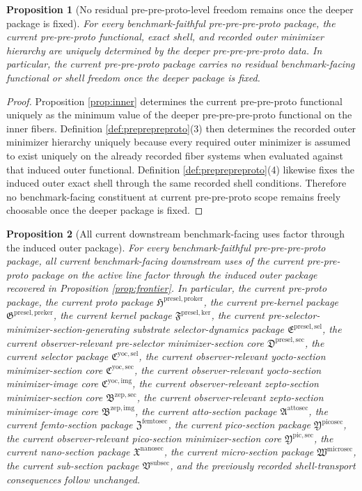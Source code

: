 \documentclass[11pt]{article}
\newcommand{\ProtoKernelPackage}{\mathfrak H^{\mathrm{presel,proker}}}
\newcommand{\PreKernelPackage}{\mathfrak G^{\mathrm{presel,preker}}}
\newcommand{\KernelPackage}{\mathfrak F^{\mathrm{presel,ker}}}
\newcommand{\PreSectionSelectorPackage}{\mathfrak E^{\mathrm{presel,sel}}}
\newcommand{\PreSelectorMinSectionCore}{\mathfrak D^{\mathrm{presel,sec}}}
\newcommand{\YoctoSelectorPackage}{\mathfrak C^{\mathrm{yoc,sel}}}
\newcommand{\YoctoImageCore}{\mathfrak C^{\mathrm{yoc,img}}}
\newcommand{\YoctoMinSectionCore}{\mathfrak C^{\mathrm{yoc,sec}}}
\newcommand{\ZeptoImageCore}{\mathfrak B^{\mathrm{zep,img}}}
\newcommand{\ZeptoMinSectionCore}{\mathfrak B^{\mathrm{zep,sec}}}
\newcommand{\AttoSectionPackage}{\mathfrak A^{\mathrm{attosec}}}
\newcommand{\FemtoSectionPackage}{\mathfrak Z^{\mathrm{femtosec}}}
\newcommand{\PicoSectionPackage}{\mathfrak Y^{\mathrm{picosec}}}
\newcommand{\PicoMinSectionCore}{\mathfrak Y^{\mathrm{pic,sec}}}
\newcommand{\NanoSectionPackage}{\mathfrak X^{\mathrm{nanosec}}}
\newcommand{\MicroSectionPackage}{\mathfrak W^{\mathrm{microsec}}}
\newcommand{\SubSectionPackage}{\mathfrak V^{\mathrm{subsec}}}
\newtheorem{proposition}{Proposition}
\begin{document}
\begin{proposition}[No residual pre-pre-proto-level freedom remains once the deeper package is fixed]
\label{prop:nofreedom}
For every benchmark-faithful pre-pre-pre-proto package, the current pre-pre-proto functional, exact shell, and recorded outer minimizer hierarchy are uniquely determined by the deeper pre-pre-pre-proto data. In particular, the current pre-pre-proto package carries no residual benchmark-facing functional or shell freedom once the deeper package is fixed.
\end{proposition}

\begin{proof}
Proposition \ref{prop:inner} determines the current pre-pre-proto functional uniquely as the minimum value of the deeper pre-pre-pre-proto functional on the inner fibers. Definition \ref{def:preprepreproto}(3) then determines the recorded outer minimizer hierarchy uniquely because every required outer minimizer is assumed to exist uniquely on the already recorded fiber systems when evaluated against that induced outer functional. Definition \ref{def:preprepreproto}(4) likewise fixes the induced outer exact shell through the same recorded shell conditions. Therefore no benchmark-facing constituent at current pre-pre-proto scope remains freely choosable once the deeper package is fixed.
\end{proof}

\begin{proposition}[All current downstream benchmark-facing uses factor through the induced outer package]
\label{prop:downstream}
For every benchmark-faithful pre-pre-pre-proto package, all current benchmark-facing downstream uses of the current pre-pre-proto package on the active line factor through the induced outer package recovered in Proposition \ref{prop:frontier}. In particular, the current pre-proto package, the current proto package \(\ProtoKernelPackage\), the current pre-kernel package \(\PreKernelPackage\), the current kernel package \(\KernelPackage\), the current pre-selector-minimizer-section-generating substrate selector-dynamics package \(\PreSectionSelectorPackage\), the current observer-relevant pre-selector minimizer-section core \(\PreSelectorMinSectionCore\), the current selector package \(\YoctoSelectorPackage\), the current observer-relevant yocto-section minimizer-section core \(\YoctoMinSectionCore\), the current observer-relevant yocto-section minimizer-image core \(\YoctoImageCore\), the current observer-relevant zepto-section minimizer-section core \(\ZeptoMinSectionCore\), the current observer-relevant zepto-section minimizer-image core \(\ZeptoImageCore\), the current atto-section package \(\AttoSectionPackage\), the current femto-section package \(\FemtoSectionPackage\), the current pico-section package \(\PicoSectionPackage\), the current observer-relevant pico-section minimizer-section core \(\PicoMinSectionCore\), the current nano-section package \(\NanoSectionPackage\), the current micro-section package \(\MicroSectionPackage\), the current sub-section package \(\SubSectionPackage\), and the previously recorded shell-transport consequences follow unchanged.
\end{proposition}
\end{document}
